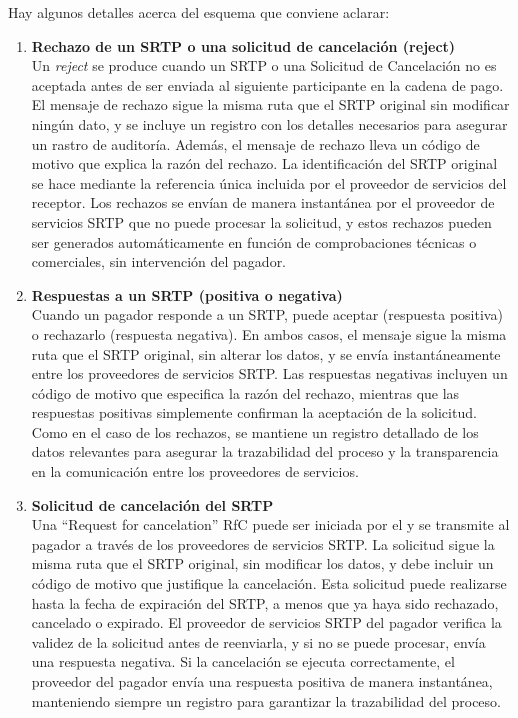 Hay algunos detalles acerca del esquema que conviene aclarar:
\begin{enumerate}
  \item \textbf{Rechazo de un SRTP o una solicitud de cancelación (reject)} \\
        Un \textit{reject} se produce cuando un SRTP o una Solicitud de Cancelación no es aceptada antes de ser enviada al siguiente participante en la cadena de pago. El mensaje de rechazo sigue la misma ruta que el SRTP original sin modificar ningún dato, y se incluye un registro con los detalles necesarios para asegurar un rastro de auditoría. Además, el mensaje de rechazo lleva un código de motivo que explica la razón del rechazo. La identificación del SRTP original se hace mediante la referencia única incluida por el proveedor de servicios del receptor. Los rechazos se envían de manera instantánea por el proveedor de servicios SRTP que no puede procesar la solicitud, y estos rechazos pueden ser generados automáticamente en función de comprobaciones técnicas o comerciales, sin intervención del pagador.

  \item \textbf{Respuestas a un SRTP (positiva o negativa)} \\
        Cuando un pagador responde a un SRTP, puede aceptar (respuesta positiva) o rechazarlo (respuesta negativa). En ambos casos, el mensaje sigue la misma ruta que el SRTP original, sin alterar los datos, y se envía instantáneamente entre los proveedores de servicios SRTP. Las respuestas negativas incluyen un código de motivo que especifica la razón del rechazo, mientras que las respuestas positivas simplemente confirman la aceptación de la solicitud. Como en el caso de los rechazos, se mantiene un registro detallado de los datos relevantes para asegurar la trazabilidad del proceso y la transparencia en la comunicación entre los proveedores de servicios.

  \item \textbf{Solicitud de cancelación del SRTP} \\
        Una “Request for cancelation” RfC puede ser iniciada por el y se transmite al pagador a través de los proveedores de servicios SRTP. La solicitud sigue la misma ruta que el SRTP original, sin modificar los datos, y debe incluir un código de motivo que justifique la cancelación. Esta solicitud puede realizarse hasta la fecha de expiración del SRTP, a menos que ya haya sido rechazado, cancelado o expirado. El proveedor de servicios SRTP del pagador verifica la validez de la solicitud antes de reenviarla, y si no se puede procesar, envía una respuesta negativa. Si la cancelación se ejecuta correctamente, el proveedor del pagador envía una respuesta positiva de manera instantánea, manteniendo siempre un registro para garantizar la trazabilidad del proceso.
\end{enumerate}
